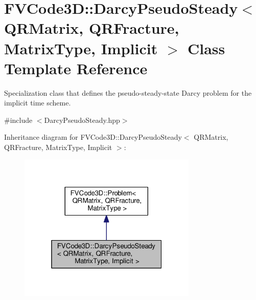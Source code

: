 \hypertarget{classFVCode3D_1_1DarcyPseudoSteady_3_01QRMatrix_00_01QRFracture_00_01MatrixType_00_01Implicit_01_4}{}\section{F\+V\+Code3D\+:\+:Darcy\+Pseudo\+Steady$<$ Q\+R\+Matrix, Q\+R\+Fracture, Matrix\+Type, Implicit $>$ Class Template Reference}
\label{classFVCode3D_1_1DarcyPseudoSteady_3_01QRMatrix_00_01QRFracture_00_01MatrixType_00_01Implicit_01_4}


Specialization class that defines the pseudo-\/steady-\/state Darcy problem for the implicit time scheme.  




{\ttfamily \#include $<$Darcy\+Pseudo\+Steady.\+hpp$>$}



Inheritance diagram for F\+V\+Code3D\+:\+:Darcy\+Pseudo\+Steady$<$ Q\+R\+Matrix, Q\+R\+Fracture, Matrix\+Type, Implicit $>$\+:
\nopagebreak
\begin{figure}[H]
\begin{center}
\leavevmode
\includegraphics[width=241pt]{classFVCode3D_1_1DarcyPseudoSteady_3_01QRMatrix_00_01QRFracture_00_01MatrixType_00_01Implicit_01_4__inherit__graph}
\end{center}
\end{figure}


